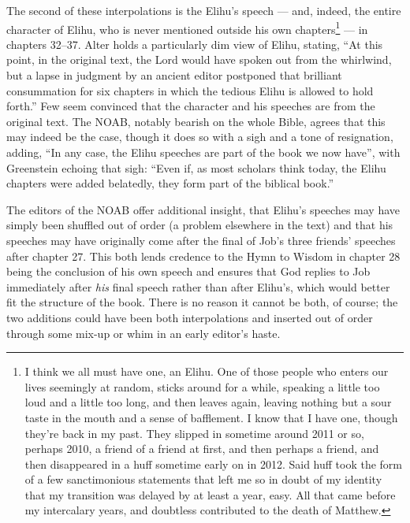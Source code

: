
The second of these interpolations is the Elihu's speech --- and, indeed, the entire character of Elihu, who is never mentioned outside his own chapters\footnote{I think we all must have one, an Elihu. One of those people who enters our lives seemingly at random, sticks around for a while, speaking a little too loud and a little too long, and then leaves again, leaving nothing but a sour taste in the mouth and a sense of bafflement. I know that I have one, though they're back in my past. They slipped in sometime around 2011 or so, perhaps 2010, a friend of a friend at first, and then perhaps a friend, and then disappeared in a huff sometime early on in 2012. Said huff took the form of a few sanctimonious statements that left me so in doubt of my identity that my transition was delayed by at least a year, easy. All that came before my intercalary years, and doubtless contributed to the death of Matthew.} --- in chapters 32--37. Alter holds a particularly dim view of Elihu, stating, ``At this point, in the original text, the Lord would have spoken out from the whirlwind, but a lapse in judgment by an ancient editor postponed that brilliant consummation for six chapters in which the tedious Elihu is allowed to hold forth.'' \parencite[460]{alter} Few seem convinced that the character and his speeches are from the original text. The NOAB, notably bearish on the whole Bible, agrees that this may indeed be the case, though it does so with a sigh and a tone of resignation, adding, ``In any case, the Elihu speeches are part of the book we now have'', \parencite[767]{noab} with Greenstein echoing that sigh: ``Even if, as most scholars think today, the Elihu chapters were added belatedly, they form part of the biblical book.'' \parencite[22]{greenstein}

The editors of the NOAB offer additional insight, that Elihu's speeches may have simply been shuffled out of order (a problem elsewhere in the text) and that his speeches may have originally come after the final of Job's three friends' speeches after chapter 27. This both lends credence to the Hymn to Wisdom in chapter 28 being the conclusion of his own speech and ensures that God replies to Job immediately after \emph{his} final speech rather than after Elihu's, which would better fit the structure of the book. There is no reason it cannot be both, of course; the two additions could have been both interpolations and inserted out of order through some mix-up or whim in an early editor's haste.

